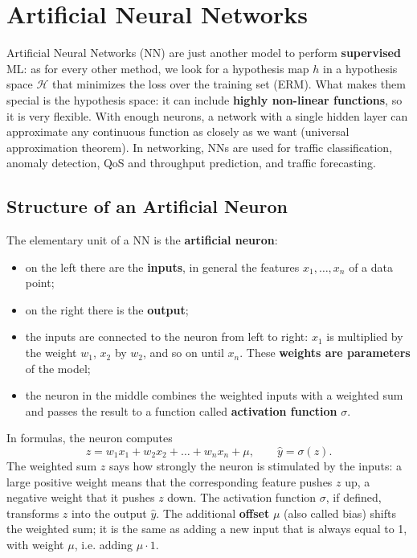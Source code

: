\chapter{Artificial Neural Networks}

Artificial Neural Networks (NN) are just another model to perform \textbf{supervised} ML: as for every other method, we look for a hypothesis map $h$ in a hypothesis space $\mathcal{H}$ that minimizes the loss over the training set (ERM). What makes them special is the hypothesis space: it can include \textbf{highly non-linear functions}, so it is very flexible. With enough neurons, a network with a single hidden layer can approximate any continuous function as closely as we want (universal approximation theorem). In networking, NNs are used for traffic classification, anomaly detection, QoS and throughput prediction, and traffic forecasting.

\section{Structure of an Artificial Neuron}
The elementary unit of a NN is the \textbf{artificial neuron}:
\begin{itemize}
    \item on the left there are the \textbf{inputs}, in general the features $x_1, \dots, x_n$ of a data point;
    \item on the right there is the \textbf{output};
    \item the inputs are connected to the neuron from left to right: $x_1$ is multiplied by the weight $w_1$, $x_2$ by $w_2$, and so on until $x_n$. These \textbf{weights are parameters} of the model;
    \item the neuron in the middle combines the weighted inputs with a weighted sum and passes the result to a function called \textbf{activation function} $\sigma$.
\end{itemize}
In formulas, the neuron computes
\[
z = w_1x_1 + w_2x_2 + \dots + w_nx_n + \mu, \qquad \widehat{y} = \sigma(z) .
\]
The weighted sum $z$ says how strongly the neuron is stimulated by the inputs: a large positive weight means that the corresponding feature pushes $z$ up, a negative weight that it pushes $z$ down. The activation function $\sigma$, if defined, transforms $z$ into the output $\widehat{y}$. The additional \textbf{offset} $\mu$ (also called bias) shifts the weighted sum; it is the same as adding a new input that is always equal to 1, with weight $\mu$, i.e. adding $\mu \cdot 1$.

